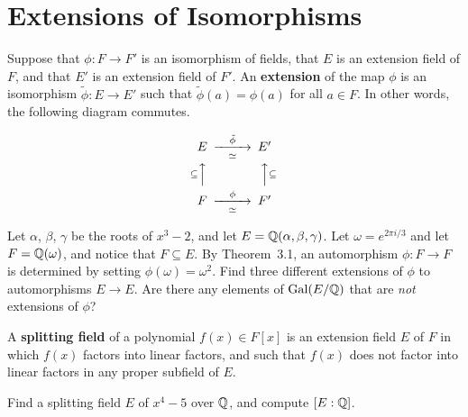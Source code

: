 \section{Extensions of Isomorphisms}

\begin{definition}
    Suppose that $\phi:F \longrightarrow F'$ is an isomorphism of fields, that $E$ is an extension field of $F$, and that $E'$ is an extension field of $F'$. An \textbf{extension} of the map $\phi$ is an isomorphism $\tilde{\phi}:E\longrightarrow E'$ such that $\tilde{\phi}(a)=\phi(a)$ for all $a\in F$. In other words, the following diagram commutes.
\begin{annotation}
\end{annotation}
    $$
    \begin{CD}
        E              @>\tilde{\phi}>\simeq>   E' \\
        @A\subseteq AA                          @AA\subseteq A \\
        F              @>\phi>\simeq>           F'
    \end{CD}
    $$
\end{definition}

\begin{problem}\label{prob:3exts}
    Let $\alpha$, $\beta$, $\gamma$ be the roots of $x^3-2$, and let $E = \mathbb{Q}(\alpha,\beta,\gamma)$. Let $\omega = e^{2\pi i/3}$ and let $F=\mathbb{Q}(\omega)$, and notice that $F\subseteq E$. By Theorem~3.1, an automorphism $\phi:F\longrightarrow F$ is determined by setting $\phi(\omega)=\omega^2$. Find three different extensions of $\phi$ to automorphisms $E\longrightarrow E$. Are there any elements of $\operatorname{Gal}(E/\mathbb{Q})$ that are \textit{not} extensions of $\phi$?
\end{problem}

\begin{definition}
    A \textbf{splitting field} of a polynomial $f(x)\in F[x]$ is an extension field $E$ of $F$ in which $f(x)$ factors into linear factors, and such that $f(x)$ does not factor into linear factors in any proper subfield of $E$.
\end{definition}

\begin{problem}\label{prob:x4m5split}
Find a splitting field $E$ of $x^4-5$ over $\mathbb{Q}$, and compute $[E:\mathbb{Q}]$.
\begin{annotation}
\end{annotation}
\end{problem}

